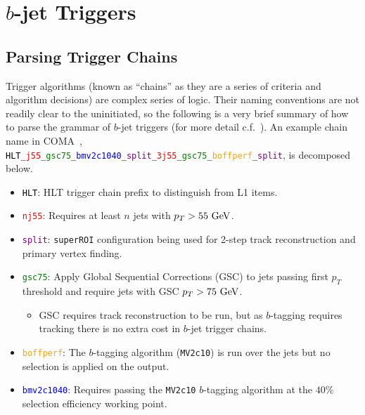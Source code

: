 \chapter{$b$-jet Triggers}\label{appendix:bjet_trigger}

\section{Parsing Trigger Chains}\label{section:trigger_chain_names}

Trigger algorithms (known as ``chains'' as they are a series of criteria and algorithm decisions) are complex series of logic.
Their naming conventions are not readily clear to the uninitiated, so the following is a very brief summary of how to parse the grammar of $b$-jet triggers (for more detail c.f.~\cite{Feickert:HbbWorkshop2017}). An example chain name in COMA~\cite{TWiki:ConditionsMetadata,COMA:ChainReport}, \texttt{\textcolor{black}{HLT}\_\textcolor{red}{j55}\_\textcolor{green}{gsc75}\_\textcolor{blue}{bmv2c1040}\_\textcolor{purple}{split}\_\textcolor{red}{3j55}\_\textcolor{green}{gsc75}\_\textcolor{orange}{boffperf}\_\textcolor{purple}{split}}, is decomposed below.
\begin{itemize}
 \item \texttt{\textcolor{black}{HLT}}: HLT trigger chain prefix to distinguish from L1 items.
 \item \texttt{\textcolor{red}{nj55}}: Requires at least $n$ jets with $p_{T} > 55~\mathrm{GeV}$.
 \item \texttt{\textcolor{purple}{split}}: \texttt{superROI} configuration being used for 2-step track reconstruction and primary vertex finding.
 \item \texttt{\textcolor{green}{gsc75}}: Apply Global Sequential Corrections (GSC) to jets passing first $p_{T}$ threshold and require jets with GSC $p_{T} > 75~\mathrm{GeV}$.
       \begin{itemize}
        \item GSC requires track reconstruction to be run, but as $b$-tagging requires tracking there is no extra cost in $b$-jet trigger chains.
       \end{itemize}
 \item \texttt{\textcolor{orange}{boffperf}}: The $b$-tagging algorithm (\texttt{MV2c10}) is run over the jets but no selection is applied on the output.
 \item \texttt{\textcolor{blue}{bmv2c1040}}: Requires passing the \texttt{MV2c10} $b$-tagging algorithm at the $40\%$ selection efficiency working point.
\end{itemize}

